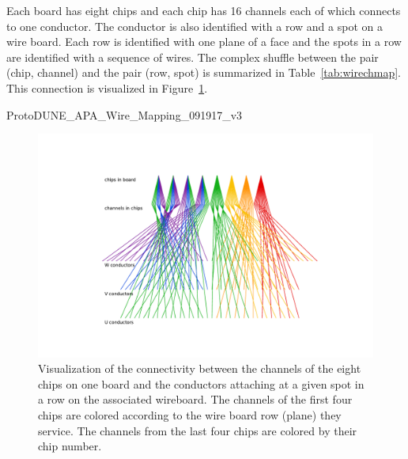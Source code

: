 \documentclass[pdftex,12pt,letter]{article}
\begin{document}
Each board has eight chips and each chip has 16 channels each of which
connects to one conductor.  The conductor is also identified with a
row and a spot on a wire board.  Each row is identified with one plane
of a face and the spots in a row are identified with a sequence of
wires.  The complex shuffle between the pair (chip, channel) and the
pair (row, spot) is summarized in Table~\ref{tab:wirechmap}.
This connection is visualized in Figure~\ref{fig:boardchip}.

\begin{table}[htp]
  \label{tab:wirechmap}
  \centering

   {ProtoDUNE_APA_Wire_Mapping_091917_v3}

  \caption{The per-board connections between a chip (columns) and its
    channel (rows, one-based count) and the local numbering the row
    and spot for a conductor connection.  The row is identified by a
    plane letter (``u'', ``v'' or ``w'') and the spot is a numbered
    count starting from one (not zero).  Counts are
    \textcolor{red}{1-40 for U plane and marked in red},
    \textcolor{blue}{1-40 for V plane and marked in blue} and
    \textbf{1-48 for W plane and marked in black}.  This pattern is
    applied for each board on each face of an APA.}
\end{table}


\begin{figure}[h]
  \centering
  \includegraphics[width=\textwidth]{test_plot_board_chip.pdf}
  \caption{Visualization of the connectivity between the channels of the eight chips on one board and the conductors attaching at a given spot in a row on the associated wireboard.  The channels of the first four chips are colored according to the wire board row (plane) they service.  The channels from the last four chips are colored by their chip number.}
  \label{fig:boardchip}
\end{figure}
\end{document}
